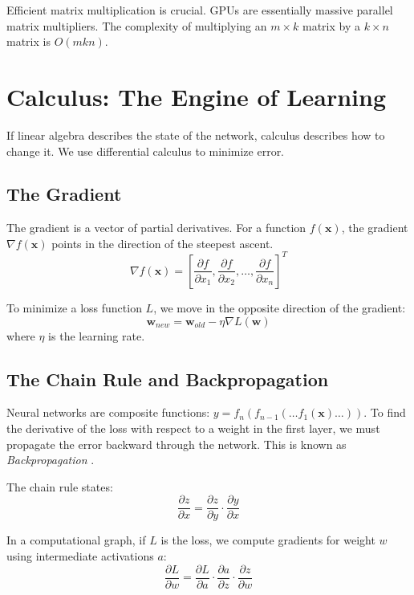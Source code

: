 Efficient matrix multiplication is crucial. GPUs are essentially massive parallel matrix multipliers. The complexity of multiplying an $m \times k$ matrix by a $k \times n$ matrix is $O(mkn)$.

\section{Calculus: The Engine of Learning}

If linear algebra describes the state of the network, calculus describes how to change it. We use differential calculus to minimize error.

\subsection{The Gradient}
The gradient is a vector of partial derivatives. For a function $f(\mathbf{x})$, the gradient $\nabla f(\mathbf{x})$ points in the direction of the steepest ascent.
\begin{equation}
    \nabla f(\mathbf{x}) = \left[ \frac{\partial f}{\partial x_1}, \frac{\partial f}{\partial x_2}, \dots, \frac{\partial f}{\partial x_n} \right]^T
\end{equation}

To minimize a loss function $L$, we move in the opposite direction of the gradient:
\begin{equation}
    \mathbf{w}_{new} = \mathbf{w}_{old} - \eta \nabla L(\mathbf{w})
\end{equation}
where $\eta$ is the learning rate.

\subsection{The Chain Rule and Backpropagation}
Neural networks are composite functions: $y = f_n(f_{n-1}(\dots f_1(\mathbf{x})\dots))$.
To find the derivative of the loss with respect to a weight in the first layer, we must propagate the error backward through the network. This is known as \textit{Backpropagation} \cite{rumelhart1986learning}.

The chain rule states:
\begin{equation}
    \frac{\partial z}{\partial x} = \frac{\partial z}{\partial y} \cdot \frac{\partial y}{\partial x}
\end{equation}

In a computational graph, if $L$ is the loss, we compute gradients for weight $w$ using intermediate activations $a$:
\begin{equation}
    \frac{\partial L}{\partial w} = \frac{\partial L}{\partial a} \cdot \frac{\partial a}{\partial z} \cdot \frac{\partial z}{\partial w}
\end{equation}

